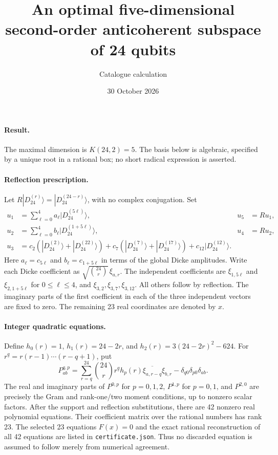 \documentclass{article}
\begin{document}
\title{An optimal five-dimensional second-order anticoherent subspace of 24 qubits}
\author{Catalogue calculation}
\date{30 October 2026}
\maketitle
\newcommand{\D}[1]{|D_{24}^{(#1)}\rangle}
\paragraph{Result.} The maximal dimension is $K(24,2)=5$. The basis below is algebraic, specified by a unique root in a rational box; no short radical expression is asserted.

\paragraph{Reflection prescription.} Let $R\D{r}=\D{24-r}$, with no complex conjugation. Set
\begin{align*}
u_1&=\sum_{\ell=0}^{4}a_\ell\D{5\ell}, & u_5&=Ru_1,\\
u_2&=\sum_{\ell=0}^{4}b_\ell\D{1+5\ell}, &u_4&=Ru_2,\\
u_3&=c_2(\D{2}+\D{22})+c_7(\D{7}+\D{17})+c_{12}\D{12}.
\end{align*}
Here $a_\ell=c_{5\ell}$ and $b_\ell=c_{1+5\ell}$ in terms of the global Dicke amplitudes.
Write each Dicke coefficient as $\sqrt{\binom{24}{r}}\,\xi_{a,r}$.
The independent coefficients are $\xi_{1,5\ell}$ and $\xi_{2,1+5\ell}$ for $0\le\ell\le4$, and $\xi_{3,2},\xi_{3,7},\xi_{3,12}$. All others follow by reflection. The imaginary parts of the first coefficient in each of the three independent vectors are fixed to zero. The remaining 23 real coordinates are denoted by $x$.

\paragraph{Integer quadratic equations.} Define $h_0(r)=1$, $h_1(r)=24-2r$, and $h_2(r)=3(24-2r)^2-624$. For $r^{\underline q}=r(r-1)\cdots(r-q+1)$, put
\[
P_{ab}^{q,p}=\sum_{r=q}^{24}\binom{24}{r}r^{\underline q}h_p(r)
\overline{\xi_{a,r-q}}\xi_{b,r}-\delta_{q0}\delta_{p0}\delta_{ab}.
\]
The real and imaginary parts of $P^{0,p}$ for $p=0,1,2$, $P^{1,p}$ for $p=0,1$, and $P^{2,0}$ are precisely the Gram and rank-one/two moment conditions, up to nonzero scalar factors. After the support and reflection substitutions, there are 42 nonzero real polynomial equations. Their coefficient matrix over the rational numbers has rank 23. The selected 23 equations $F(x)=0$ and the exact rational reconstruction of all 42 equations are listed in \texttt{certificate.json}. Thus no discarded equation is assumed to follow merely from numerical agreement.
\end{document}
